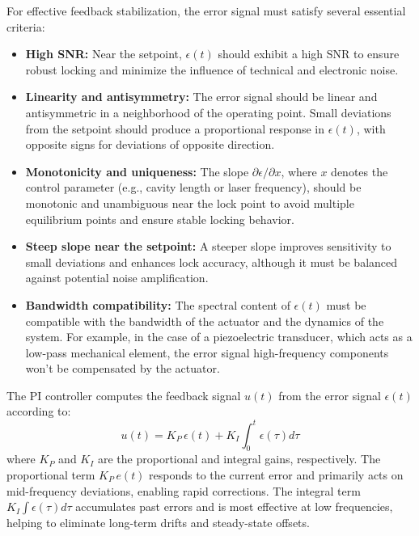 \noindent For effective feedback stabilization, the error signal must satisfy several essential criteria:
\begin{itemize}
    \item \textbf{High SNR:} Near the setpoint, \( \epsilon(t) \) should exhibit a high SNR to ensure robust locking and minimize the influence of technical and electronic noise.
    \item \textbf{Linearity and antisymmetry:} The error signal should be linear and antisymmetric in a neighborhood of the operating point. Small deviations from the setpoint should produce a proportional response in \( \epsilon(t) \), with opposite signs for deviations of opposite direction.
    \item \textbf{Monotonicity and uniqueness:} The slope \( \partial \epsilon / \partial x \), where \( x \) denotes the control parameter (e.g., cavity length or laser frequency), should be monotonic and unambiguous near the lock point to avoid multiple equilibrium points and ensure stable locking behavior.
    \item \textbf{Steep slope near the setpoint:} A steeper slope improves sensitivity to small deviations and enhances lock accuracy, although it must be balanced against potential noise amplification.
    \item \textbf{Bandwidth compatibility:} The spectral content of \( \epsilon(t) \) must be compatible with the bandwidth of the actuator and the dynamics of the system. For example, in the case of a piezoelectric transducer, which acts as a low-pass mechanical element, the error signal high-frequency components won't be compensated by the actuator.  
\end{itemize}

\noindent The PI controller computes the feedback signal \( u(t) \) from the error signal \( \epsilon(t) \) according to:
\begin{equation}
    u(t) = K_P \, \epsilon(t) + K_I \int_0^t \epsilon(\tau) d\tau
    \tag{III.1}
\end{equation}
where \( K_P \) and \( K_I \) are the proportional and integral gains, respectively. The proportional term \( K_P \, e(t) \) responds to the current error and primarily acts on mid-frequency deviations, enabling rapid corrections. The integral term \( K_I \int \epsilon(\tau) d\tau \) accumulates past errors and is most effective at low frequencies, helping to eliminate long-term drifts and steady-state offsets. \newline

